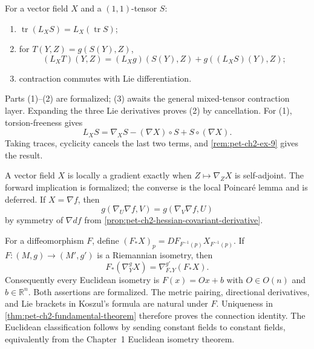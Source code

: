 \begin{remark}
  \label{rem:pet-ch2-ex-10}
  \leanok
  For a vector field $X$ and a $(1,1)$-tensor
  $S$:
  \begin{enumerate}
    \item $\operatorname{tr}(L_XS)=L_X(\operatorname{tr}S)$;
    \item for $T(Y,Z)=g(S(Y),Z)$,
      \[
        (L_XT)(Y,Z)=(L_Xg)(S(Y),Z)+g((L_XS)(Y),Z);
      \]
    \item contraction commutes with Lie differentiation.
  \end{enumerate}
  Parts (1)--(2) are formalized; (3) awaits the general mixed-tensor
  contraction layer.
  \sketch
  Expanding the three Lie derivatives proves (2) by cancellation. For (1),
  torsion-freeness gives
  \[
    L_XS=\nabla_XS-(\nabla X)\circ S+S\circ(\nabla X).
  \]
  Taking traces, cyclicity cancels the last two terms, and
  \cref{rem:pet-ch2-ex-9} gives the result.
\end{remark}

\begin{remark}
  \label{rem:pet-ch2-ex-11}
  \leanok
  A vector field $X$ is locally a gradient
  exactly when $Z\mapsto\nabla_ZX$ is self-adjoint.
  The forward implication is formalized; the converse is the local
  Poincar\'e lemma and is deferred.
  \sketch
  If $X=\nabla f$, then
  \[
    g(\nabla_U\nabla f,V)=g(\nabla_V\nabla f,U)
  \]
  by symmetry of $\nabla df$ from
  \cref{prop:pet-ch2-hessian-covariant-derivative}.
\end{remark}

\begin{remark}
  \label{rem:pet-ch2-ex-12}
  \leanok
  For a diffeomorphism $F$, define
  $(F_*X)_p=DF_{F^{-1}(p)}X_{F^{-1}(p)}$. If $F:(M,g)\to(M',g')$ is a
  Riemannian isometry, then
  \[
    F_*(\nabla^g_YX)=\nabla^{g'}_{F_*Y}(F_*X).
  \]
  Consequently every Euclidean isometry is $F(x)=Ox+b$ with
  $O\in O(n)$ and $b\in\mathbb{R}^n$. Both assertions are formalized.
  \sketch
  The metric pairing, directional derivatives, and Lie brackets in Koszul's
  formula are natural under $F$. Uniqueness in
  \cref{thm:pet-ch2-fundamental-theorem} therefore proves the connection
  identity. The Euclidean classification follows by sending constant fields
  to constant fields, equivalently from the Chapter~1 Euclidean isometry
  theorem.
\end{remark}

